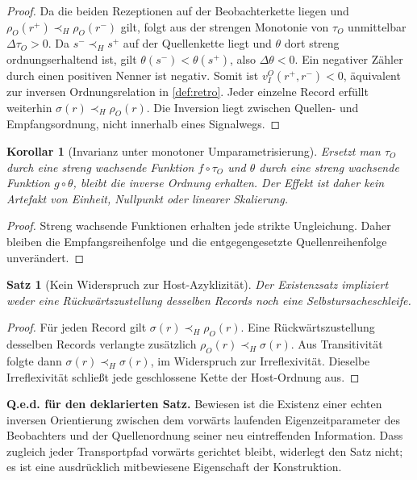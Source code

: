 \documentclass[11pt,a4paper]{article}
\newtheorem{satz}{Satz}[section]
\newtheorem{korollar}{Korollar}[section]
\theoremstyle{remark}
\newcommand{\host}{\prec_{\!H}}
\newcommand{\statusbox}[2]{%
  \par\medskip\noindent
  \colorbox{#1}{\parbox{\dimexpr\linewidth-2\fboxsep\relax}{#2}}%
  \par\medskip
}
\begin{document}
\begin{proof}
Da die beiden Rezeptionen auf der Beobachterkette liegen und
\(\rho_O(r^+)\host\rho_O(r^-)\) gilt, folgt aus der strengen Monotonie von
\(\tau_O\) unmittelbar \(\Delta\tau_O>0\). Da \(s^-\host s^+\) auf der
Quellenkette liegt und \(\theta\) dort streng ordnungserhaltend ist, gilt
\(\theta(s^-)<\theta(s^+)\), also \(\Delta\theta<0\). Ein negativer Zähler
durch einen positiven Nenner ist negativ. Somit ist
\(v_I^O(r^+,r^-)<0\), äquivalent zur inversen Ordnungsrelation in
\cref{def:retro}. Jeder einzelne Record erfüllt weiterhin
\(\sigma(r)\host\rho_O(r)\). Die Inversion liegt zwischen Quellen- und
Empfangsordnung, nicht innerhalb eines Signalwegs.
\end{proof}

\begin{korollar}[Invarianz unter monotoner Umparametrisierung]
Ersetzt man \(\tau_O\) durch eine streng wachsende Funktion
\(f\!\circ\!\tau_O\) und \(\theta\) durch eine streng wachsende Funktion
\(g\!\circ\!\theta\), bleibt die inverse Ordnung erhalten. Der Effekt ist
daher kein Artefakt von Einheit, Nullpunkt oder linearer Skalierung.
\end{korollar}

\begin{proof}
Streng wachsende Funktionen erhalten jede strikte Ungleichung. Daher bleiben
die Empfangsreihenfolge und die entgegengesetzte Quellenreihenfolge
unverändert.
\end{proof}

\begin{satz}[Kein Widerspruch zur Host-Azyklizität]
\label{thm:no-cycle}
Der Existenzsatz impliziert weder eine Rückwärtszustellung desselben Records
noch eine Selbstursacheschleife.
\end{satz}

\begin{proof}
Für jeden Record gilt \(\sigma(r)\host\rho_O(r)\). Eine Rückwärtszustellung
desselben Records verlangte zusätzlich
\(\rho_O(r)\host\sigma(r)\). Aus Transitivität folgte dann
\(\sigma(r)\host\sigma(r)\), im Widerspruch zur Irreflexivität. Dieselbe
Irreflexivität schließt jede geschlossene Kette der Host-Ordnung aus.
\end{proof}

\statusbox{QGreen}{
  \textbf{Q.e.d. für den deklarierten Satz.}
  Bewiesen ist die Existenz einer echten inversen Orientierung zwischen dem
  vorwärts laufenden Eigenzeitparameter des Beobachters und der
  Quellenordnung seiner neu eintreffenden Information. Dass zugleich jeder
  Transportpfad vorwärts gerichtet bleibt, widerlegt den Satz nicht; es ist
  eine ausdrücklich mitbewiesene Eigenschaft der Konstruktion.
}
\end{document}
